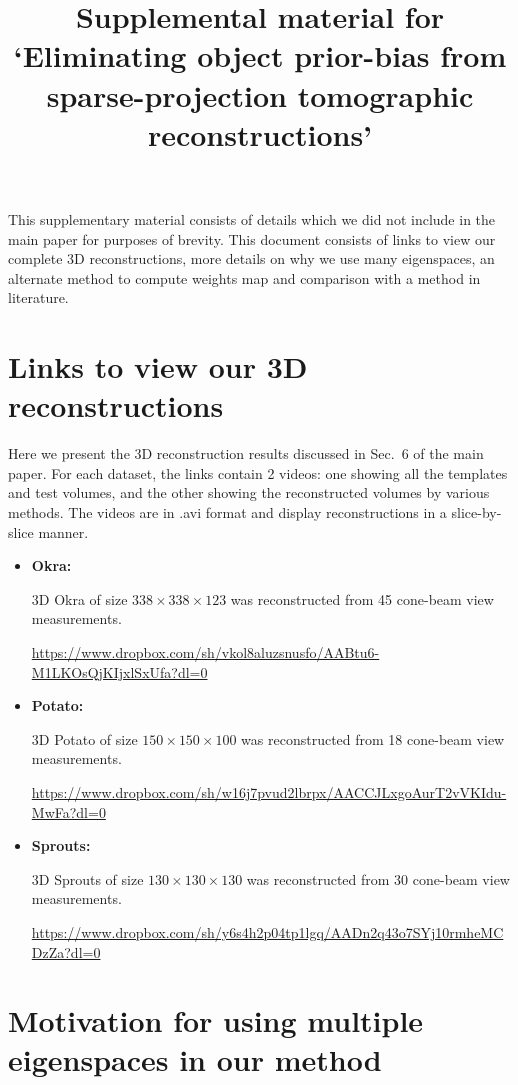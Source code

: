 \documentclass{article}
\title{Supplemental material for `Eliminating object prior-bias from sparse-projection
tomographic reconstructions'}
\begin{document}
\maketitle
This supplementary material consists of details which we did not include in the main paper for purposes of brevity. This document consists of links to view our complete 3D reconstructions, more details on why we use many eigenspaces, an alternate method to compute weights map and comparison with a method in literature.
\tableofcontents


\section{Links to view our 3D reconstructions}
Here we present the 3D reconstruction results discussed in Sec.~6 of the main paper. For each dataset, the links contain 2 videos: one showing all the templates and test volumes, and the other showing the reconstructed volumes by various methods. The videos are in .avi format and display reconstructions in a slice-by-slice manner.

\begin{itemize}
\item \textbf{Okra:}

  3D Okra of size $338\times 338\times 123$ was reconstructed from 45 cone-beam view measurements.

  \url{https://www.dropbox.com/sh/vkol8aluzsnusfo/AABtu6-M1LKOsQjKIjxlSxUfa?dl=0}
\item \textbf{Potato:} 

    3D Potato of size $150\times 150\times 100$ was reconstructed from 18 cone-beam view measurements.

  \url{https://www.dropbox.com/sh/w16j7pvud2lbrpx/AACCJLxgoAurT2vVKIdu-MwFa?dl=0}
\item \textbf{Sprouts:}
 
    3D Sprouts of size $130\times 130\times 130$ was reconstructed from 30 cone-beam view measurements.

  \url{https://www.dropbox.com/sh/y6s4h2p04tp1lgq/AADn2q43o7SYj10rmheMCDzZa?dl=0}
\end{itemize}

\section{Motivation for using multiple eigenspaces in our method}
\end{document}
